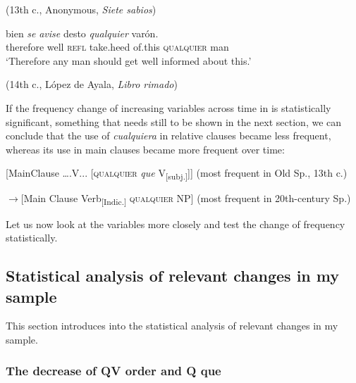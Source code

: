     (13th c., Anonymous, \textit{Siete sabios})
    
\ex \label{ex:key:281-2} 

 bien \textit{se} \textit{avise} desto \textit{qualquier} varón.\\
therefore well \textsc{refl} take.heed of.this \textsc{qualquier} man\\
    \glt ‘Therefore any man should get well informed about this.’

    (14th c., López de Ayala, \textit{Libro rimado})
\z
\z

If the frequency change of increasing variables across time in  is statistically significant, something that needs still to be shown in the next section, we can conclude that the use of \textit{cualquiera} in relative clauses became less frequent, whereas its use in main clauses became more frequent over time:

\ea{} \label{ex:key:282}
  [MainClause ….V... [\textsc{qualquier} \textit{que} V\textsubscript{[subj.]}]] (most frequent in Old Sp., 13th c.)

  $\rightarrow$[Main Clause Verb\textsubscript{[Indic.]} \textsc{qualquier} NP] (most frequent in 20th-century Sp.)
\z

Let us now look at the variables more closely and test the change of frequency statistically.

\subsection{{Statistical} {analysis} {of} {relevant} {changes} {in} {my} {sample}} \label{sec:5.2.1}

This section introduces into the statistical analysis of relevant changes in my sample.

\subsubsection{{The decrease of QV order and Q que}} \label{sec:5.2.1.1}

